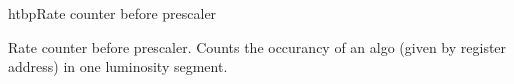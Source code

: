 
\begin{register}{htbp}{Rate counter before prescaler}{}
	\label{rate_counter_before_prescaler_regs}%
	\regnewline%

	\begin{regdesc}
	\begin{reglist}
		\item [rate\_counter\_before\_prescaler] Rate counter before prescaler. Counts the occurancy of an algo (given by register address) in one luminosity segment.
	\end{reglist}
	\end{regdesc}
\end{register}

